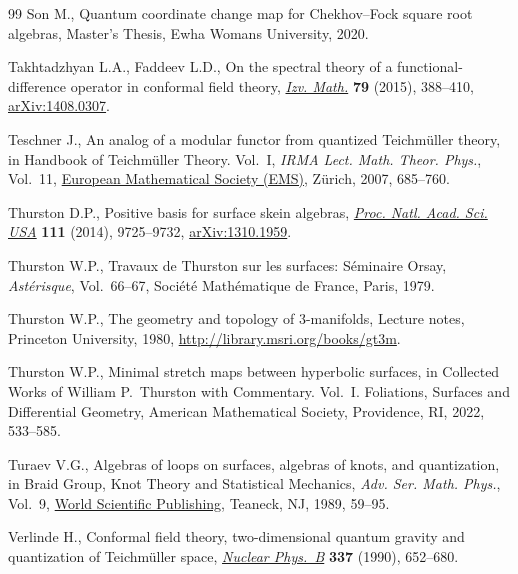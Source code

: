 \begin{thebibliography}{99}
Son M., Quantum coordinate change map for {C}hekhov--{F}ock square root
 algebras, {M}aster's Thesis, Ewha Womans University, 2020.

Takhtadzhyan L.A., Faddeev L.D., On the spectral theory of a
 functional-difference operator in conformal field theory,
 \href{https://doi.org/10.1070/IM2015v079n02ABEH002747}{\textit{Izv. Math.}}
 \textbf{79} (2015), 388--410,
 \href{http://arxiv.org/abs/1408.0307}{arXiv:1408.0307}.

Teschner J., An analog of a modular functor from quantized {T}eichm\"{u}ller
 theory, in Handbook of {T}eichm\"{u}ller Theory. {V}ol.~{I}, \textit{IRMA
 Lect. Math. Theor. Phys.}, Vol.~11,
 \href{https://doi.org/10.4171/029-1/17}{European Mathematical Society (EMS)},
 Z\"{u}rich, 2007, 685--760.

Thurston D.P., Positive basis for surface skein algebras,
 \href{https://doi.org/10.1073/pnas.1313070111}{\textit{Proc. Natl. Acad. Sci.
 USA}} \textbf{111} (2014), 9725--9732,
 \href{http://arxiv.org/abs/1310.1959}{arXiv:1310.1959}.

Thurston W.P., Travaux de {T}hurston sur les surfaces: {S}\'{e}minaire {O}rsay,
 \textit{Ast\'{e}risque}, Vol.~66--67, Soci\'{e}t\'{e} Math\'{e}matique de
 France, Paris, 1979.

Thurston W.P., The geometry and topology of $3$-manifolds, {L}ecture notes,
 Princeton University, 1980, \url{http://library.msri.org/books/gt3m}.

Thurston W.P., Minimal stretch maps between hyperbolic surfaces, in Collected
 Works of {W}illiam {P}.~{T}hurston with Commentary. {V}ol.~{I}. {F}oliations,
 Surfaces and Differential Geometry, American Mathematical Society,
 Providence, RI, 2022, 533--585.

Turaev V.G., Algebras of loops on surfaces, algebras of knots, and
 quantization, in Braid Group, Knot Theory and Statistical Mechanics,
 \textit{Adv. Ser. Math. Phys.}, Vol.~9,
 \href{https://doi.org/10.1142/9789812798350_0003}{World Scientific
 Publishing}, Teaneck, NJ, 1989, 59--95.

Verlinde H., Conformal field theory, two-dimensional quantum gravity and
 quantization of {T}eichm\"{u}ller space,
 \href{https://doi.org/10.1016/0550-3213(90)90510-K}{\textit{Nuclear Phys.~B}}
 \textbf{337} (1990), 652--680.

\end{thebibliography}
